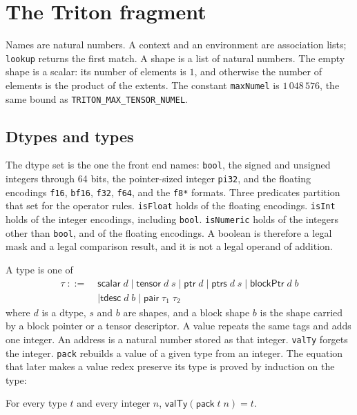 \documentclass[a4paper,UKenglish,anonymous,cleveref,autoref]{lipics-v2021}
\begin{document}
\section{The Triton fragment}
\label{sec:triton-syn}

Names are natural numbers.
A context and an environment are association lists; \texttt{lookup} returns the first match.
A shape is a list of natural numbers.
The empty shape is a scalar: its number of elements is \(1\), and otherwise the number of elements is the product of the extents.
The constant \texttt{maxNumel} is \(1\,048\,576\), the same bound as \texttt{TRITON\_MAX\_TENSOR\_NUMEL}.

\subsection{Dtypes and types}

The dtype set is the one the front end names: \texttt{bool}, the signed and unsigned integers through 64 bits, the pointer-sized integer \texttt{pi32}, and the floating encodings \texttt{f16}, \texttt{bf16}, \texttt{f32}, \texttt{f64}, and the \texttt{f8*} formats.
Three predicates partition that set for the operator rules.
\texttt{isFloat} holds of the floating encodings.
\texttt{isInt} holds of the integer encodings, including \texttt{bool}.
\texttt{isNumeric} holds of the integers other than \texttt{bool}, and of the floating encodings.
A boolean is therefore a legal mask and a legal comparison result, and it is not a legal operand of addition.

A type is one of
\[
\begin{aligned}
\tau \;::=\;& \mathsf{scalar}\;d
\mid \mathsf{tensor}\;d\;s
\mid \mathsf{ptr}\;d
\mid \mathsf{ptrs}\;d\;s
\mid \mathsf{blockPtr}\;d\;b \\
&\mid \mathsf{tdesc}\;d\;b
\mid \mathsf{pair}\;\tau_1\;\tau_2
\end{aligned}
\]
where \(d\) is a dtype, \(s\) and \(b\) are shapes, and a block shape \(b\) is the shape carried by a block pointer or a tensor descriptor.
A value repeats the same tags and adds one integer.
An address is a natural number stored as that integer.
\texttt{valTy} forgets the integer.
\texttt{pack} rebuilds a value of a given type from an integer.
The equation that later makes a value redex preserve its type is proved by induction on the type:
\begin{theorem}
For every type \(t\) and every integer \(n\), \(\mathsf{valTy}(\mathsf{pack}\;t\;n) = t\).
\end{theorem}
\end{document}
